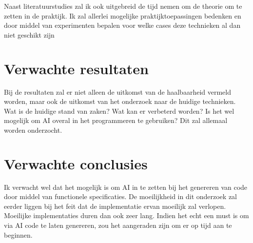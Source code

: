 Naast literatuurstudies zal ik ook uitgebreid de tijd nemen om de theorie om te zetten in de praktijk. Ik zal allerlei mogelijke praktijktoepassingen bedenken en door middel van experimenten bepalen voor welke cases deze technieken al dan niet geschikt zijn

\section{Verwachte resultaten}
\label{sec:verwachte_resultaten}

Bij de resultaten zal er niet alleen de uitkomst van de haalbaarheid vermeld worden, maar ook de uitkomst van het onderzoek naar de huidige technieken. Wat is de huidige stand van zaken? Wat kan er verbeterd worden? Is het wel mogelijk om AI overal in het programmeren te gebruiken? Dit zal allemaal worden onderzocht.

\section{Verwachte conclusies}
\label{sec:verwachte_conclusies}

Ik verwacht wel dat het mogelijk is om AI in te zetten bij het genereren van code door middel van functionele specificaties. De moeilijkheid in dit onderzoek zal eerder liggen bij het feit dat de implementatie ervan moeilijk zal verlopen. Moeilijke implementaties duren dan ook zeer lang. Indien het echt een must is om via AI code te laten genereren, zou het aangeraden zijn om er op tijd aan te beginnen.

